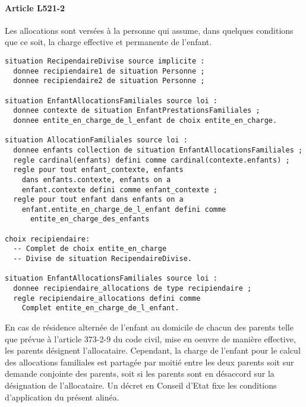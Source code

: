 \documentclass[11pt, french]{article}
\begin{document}
\paragraph{Article L521-2} Les allocations sont versées à la personne qui assume, dans quelques conditions que ce soit, la charge effective et permanente de l'enfant.
\begin{lstlisting}
situation RecipendaireDivise source implicite :
  donnee recipiendaire1 de situation Personne ;
  donnee recipiendaire2 de situation Personne ;

situation EnfantAllocationsFamiliales source loi :
  donnee contexte de situation EnfantPrestationsFamiliales ;
  donnee entite_en_charge_de_l_enfant de choix entite_en_charge.

situation AllocationFamiliales source loi :
  donnee enfants collection de situation EnfantAllocationsFamiliales ;
  regle cardinal(enfants) defini comme cardinal(contexte.enfants) ;
  regle pour tout enfant_contexte, enfants
    dans enfants.contexte, enfants on a
    enfant.contexte defini comme enfant_contexte ;
  regle pour tout enfant dans enfants on a
    enfant.entite_en_charge_de_l_enfant defini comme
      entite_en_charge_des_enfants

choix recipiendaire:
  -- Complet de choix entite_en_charge
  -- Divise de situation RecipendaireDivise.

situation EnfantAllocationsFamiliales source loi :
  donnee recipiendaire_allocations de type recipiendaire ;
  regle recipiendaire_allocations defini comme
    Complet entite_en_charge_de_l_enfant.
\end{lstlisting}
En cas de résidence alternée de l'enfant au domicile de chacun des parents telle que prévue à l'article 373-2-9 du code civil, mise en oeuvre de manière effective, les parents désignent l'allocataire. Cependant, la charge de l'enfant pour le calcul des allocations familiales est partagée par moitié entre les deux parents soit sur demande conjointe des parents, soit si les parents sont en désaccord sur la désignation de l'allocataire. Un décret en Conseil d'Etat fixe les conditions d'application du présent alinéa.
\end{document}
